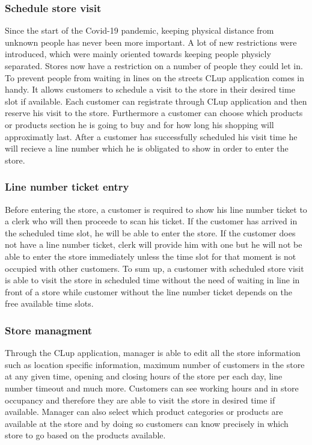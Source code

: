 \subsubsection {Schedule store visit}
Since the start of the Covid-19 pandemic, keeping physical distance from unknown people has never been more important. A lot of new restrictions were introduced, which were mainly oriented towards keeping people physicly separated. Stores now have a restriction on a number of people they could let in. To prevent people from waiting in lines on the streets CLup application comes in handy. It allows customers to schedule a visit to the store in their desired time slot if available. Each customer can registrate through CLup application and then reserve his visit to the store. Furthermore a customer can choose which products or products section he is going to buy and for how long his shopping will approximatly last. After a customer has successfully scheduled his visit time he will recieve a line number which he is obligated to show in order to enter the store.

\subsubsection {Line number ticket entry}
Before entering the store, a customer is required to show his line number ticket to a clerk who will then proceede to scan his ticket. If the customer has arrived in the scheduled time slot, he will be able to enter the store. If the customer does not have a line number ticket, clerk will provide him with one but he will not be able to enter the store immediately unless the time slot for that moment is not occupied with other customers. To sum up, a customer with scheduled store visit is able to visit the store in scheduled time without the need of waiting in line in front of a store while customer without the line number ticket depends on the free available time slots.

\subsubsection {Store managment}
Through the CLup application, manager is able to edit all the store information such as location specific information, maximum number of customers in the store at any given time, opening and closing hours of the store per each day, line number timeout and much more. Customers can see working hours and in store occupancy and therefore they are able to visit the store in desired time if available. Manager can also select which product categories or products are available at the store and by doing so customers can know precisely in which store to go based on the products available.

